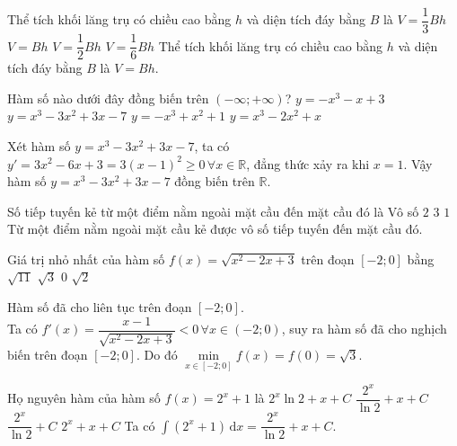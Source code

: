 \begin{ex}%
	Thể tích khối lăng trụ có chiều cao bằng $h$ và diện tích đáy bằng $B$ là
		\choice
	{$V=\dfrac{1}{3}Bh$}
	{\True $V=Bh$}
	{$V=\dfrac{1}{2}Bh$}
	{$V=\dfrac{1}{6}Bh$}
	\loigiai
	{Thể tích khối lăng trụ có chiều cao bằng $h$ và diện tích đáy bằng $B$ là  $V=Bh$.
	}
\end{ex}

\begin{ex}%
	Hàm số nào dưới đây đồng biến trên $(-\infty; +\infty)$?
		\choice
	{$y=-x^3-x+3$}
	{\True $y=x^3-3x^2+3x-7$}
	{$y=-x^3+x^2+1$}
	{$y=x^3-2x^2+x$}
	\loigiai
	{ Xét hàm số $y=x^3-3x^2+3x-7$, ta có $y' = 3x^2 -6x+3 =3(x-1)^2 \geq 0\, \forall x \in \mathbb{R}$, đẳng thức xảy ra khi $x=1$. Vậy hàm số $y=x^3-3x^2+3x-7$ đồng biến trên $\mathbb{R}.$
		
	}
\end{ex}

\begin{ex}%
	Số tiếp tuyến kẻ từ một điểm nằm ngoài mặt cầu đến mặt cầu đó là
		\choice
	{\True Vô số}
	{$2$}
	{$3$}
	{$1$}
	\loigiai
	{ Từ một điểm nằm ngoài mặt cầu kẻ được vô số tiếp tuyến đến mặt cầu đó.
	}
\end{ex}

\begin{ex}%
	Giá trị nhỏ nhất của hàm số $f(x)=\sqrt{x^2-2x+3}$ trên đoạn $\left[-2;0 \right]$ bằng
		\choice
	{$\sqrt{11}$}
	{\True $\sqrt{3}$}
	{$0$}
	{$\sqrt{2}$}
	\loigiai
	{ Hàm số đã cho liên tục trên đoạn $\left[-2;0 \right]$.\\
		Ta có $f'(x)= \dfrac{x-1}{\sqrt{x^2-2x+3}} <0 \, \forall x \in \left(-2;0 \right)$, suy ra hàm số đã cho nghịch biến trên đoạn $\left[-2;0 \right]$. Do đó $\min\limits_{x\in \left[-2;0 \right]} f(x) = f(0) = \sqrt{3}.$
		
	}
\end{ex}

\begin{ex}%
	Họ nguyên hàm của hàm số $f(x)=2^x+1$ là
		\choice
	{$2^x \ln 2+x+C$}
	{\True $ \dfrac{2^x}{\ln 2}+x+C$}
	{$\dfrac{2^x}{\ln 2}+C$}
	{$2^x+x+C$}
	\loigiai
	{ Ta có  $\displaystyle\int\limits \left( 2^x+1 \right)\mathrm{\,d}x = \dfrac{2^x}{\ln 2}+x+C$.
	}
\end{ex}

